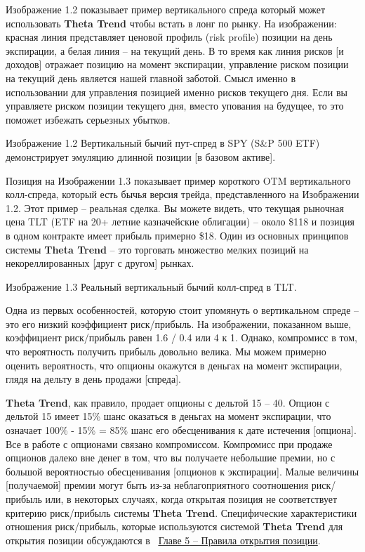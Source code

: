 \documentclass[12pt,DIV=18]{scrartcl}
\begin{document}
\bigskip

Изображение 1.2 показывает пример вертикального спреда который может использовать \textbf{Theta Trend} чтобы встать в лонг по рынку. На изображении: красная линия представляет ценовой профиль (risk profile) позиции на день экспирации, а белая линия -- на текущий день. В то время как линия рисков [и доходов] отражает позицию на момент экспирации, управление риском позиции на текущий день является нашей главной заботой. Смысл именно в использовании для управления позицией именно рисков текущего дня. Если вы управляете риском позиции текущего дня, вместо упования на будущее, то это поможет избежать серьезных убытков.

\bigskip

Изображение 1.2 Вертикальный бычий пут-спред в SPY (S\&P 500 ETF) демонстрирует эмуляцию длинной позиции [в базовом активе].

\bigskip

Позиция на Изображении 1.3 показывает пример короткого OTM вертикального колл-спреда, который есть бычья версия трейда, представленного на Изображении 1.2. Этот пример -- реальная сделка. Вы можете видеть, что текущая рыночная цена TLT (ETF на 20+ летние казначейские облигации) -- около \$118 и позиция в одном контракте имеет прибыль примерно \$18. Один из основных принципов системы \textbf{Theta Trend} -- это торговать множество мелких позиций на некореллированных [друг с другом] рынках.

\bigskip

Изображение 1.3 Реальный вертикальный бычий колл-спред в TLT.

\bigskip

Одна из первых особенностей, которую стоит упомянуть о вертикальном спреде -- это его низкий коэффициент риск/прибыль. На изображении, показанном выше, коэффициент риск/прибыль равен 1.6 / 0.4 или 4 к 1. Однако, компромисс в том, что вероятность получить прибыль довольно велика. Мы можем примерно оценить вероятность, что опционы окажутся в деньгах на момент экспирации, глядя на дельту в день продажи [спреда].

\bigskip

\textbf{Theta Trend}, как правило, продает опционы с дельтой 15 -- 40. Опцион с дельтой 15 имеет 15\% шанс оказаться в деньгах на момент экспирации, что означает 100\% - 15\% = 85\% шанс его обесценивания к дате истечения [опциона]. Все в работе с опционами связано компромиссом. Компромисс при продаже опционов далеко вне денег в том, что вы получаете небольшие премии, но с большой вероятностью  обесценивания [опционов к экспирации]. Малые величины [получаемой] премии могут быть из-за неблагоприятного соотношения риск/прибыль или, в некоторых случаях, когда открытая позиция не соответствует критерию риск/прибыль системы \textbf{Theta Trend}. Специфические характеристики отношения риск/прибыль, которые используются системой \textbf{Theta Trend} для открытия позиции обсуждаются в ~\hyperref[chapter5]{\ul{Главе 5} -- Правила открытия позиции}.
\end{document}
